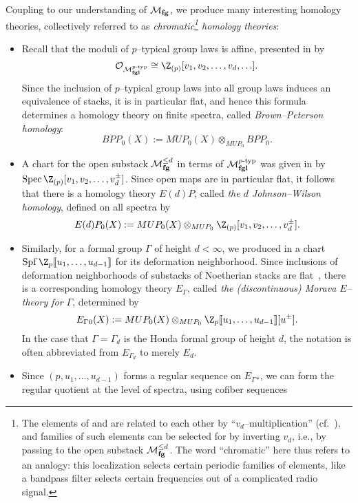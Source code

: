 \begin{definition}\label{DefnChromaticHomologyThys}
Coupling  to our understanding of $\mathcal{M}_{\mathbf{fg}}$, we produce many interesting homology theories, collectively referred to as \textit{chromatic\footnote{The elements of  and  are related to each other by ``$v_d$--multiplication'' (cf.\ ), and families of such elements can be selected for by inverting $v_d$, i.e., by passing to the open substack $\mathcal{M}_{\mathbf{fg}}^{\le d}$.  The word ``chromatic'' here thus refers to an analogy: this localization selects certain periodic families of elements, like a bandpass filter selects certain frequencies out of a complicated radio signal.} homology theories}:
\begin{itemize}
\item Recall that the moduli of $p$--typical group laws is affine, presented in  by \[\sheaf O_{\moduli{fgl}^{\ptyp}} \cong \Z_{(p)}[v_1, v_2, \ldots, v_d, \ldots].\]  Since the inclusion of $p$--typical group laws into all group laws induces an equivalence of stacks, it is in particular flat, and hence this formula determines a homology theory on finite spectra, called \textit{Brown--Peterson homology}: \[BPP_0(X) := MUP_0(X) \otimes_{MUP_0} BPP_0.\]
\item A chart for the open substack $\mathcal{M}_{\mathbf{fg}}^{\le d}$ in terms of $\mathcal{M}_{\mathbf{fgl}}^{p\text{-}\mathrm{typ}}$ was given in  by $\Spec \Z_{(p)}[v_1, v_2, \ldots, v_d^\pm]$.  Since open maps are in particular flat, it follows that there is a homology theory $E(d)P$, called \textit{the $d${\th} Johnson--Wilson homology}, defined on all spectra by \[E(d)P_0(X) := MUP_0(X) \otimes_{MUP_0} \Z_{(p)}[v_1, v_2, \ldots, v_d^\pm].\]
\item Similarly, for a formal group $\Gamma$ of height $d < \infty$, we produced in  a chart $\Spf \Z_p\ps{u_1, \ldots, u_{d-1}}$ for its deformation neighborhood.  Since inclusions of deformation neighborhoods of substacks of Noetherian stacks are flat~\cite{Matsumura}, there is a corresponding homology theory $E_\Gamma{}$, called \textit{the (discontinuous) Morava $E$--theory for $\Gamma$}, determined by \[E_\Gamma{}_0(X) := MUP_0(X) \otimes_{MUP_0} \Z_p\ps{u_1, \ldots, u_{d-1}}[u^\pm].\]  In the case that $\Gamma = \Gamma_d$ is the Honda formal group of height $d$, the notation is often abbreviated from $E_{\Gamma_d}$ to merely $E_d$.
\item Since $(p, u_1, \ldots, u_{d-1})$ forms a regular sequence on $E_\Gamma{}_*$, we can form the regular quotient at the level of spectra, using cofiber sequences

\end{itemize}
\end{definition}
